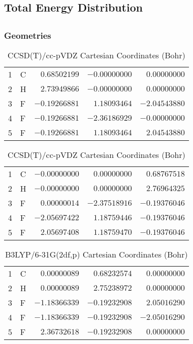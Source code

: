 \documentclass[10pt,oneside]{article}
\begin{document}
\begin{table}
\subsection*{Total Energy Distribution}
\centering\end{table}

\clearpage

\subsection{}

\begin{table}[h!]
\subsubsection*{Geometries}
\begin{multicols}{2}
\centering
\caption{CCSD(T)/cc-pVTZ Cartesian Coordinates (Bohr)}
\begin{tabular}{llrrr}
\toprule
1  & C  & $ 0.68502199$ & $-0.00000000$ & $ 0.00000000$ \\
2  & H  & $ 2.73949866$ & $-0.00000000$ & $ 0.00000000$ \\
3  & F  & $-0.19266881$ & $ 1.18093464$ & $-2.04543880$ \\
4  & F  & $-0.19266881$ & $-2.36186929$ & $-0.00000000$ \\
5  & F  & $-0.19266881$ & $ 1.18093464$ & $ 2.04543880$ \\
\bottomrule
\end{tabular}
\caption{CCSD(T)/cc-pVDZ Cartesian Coordinates (Bohr)}
\begin{tabular}{llrrr}
\toprule
1  & C  & $-0.00000000$ & $ 0.00000000$ & $ 0.68767518$ \\
2  & H  & $-0.00000000$ & $ 0.00000000$ & $ 2.76964325$ \\
3  & F  & $ 0.00000014$ & $-2.37518916$ & $-0.19376046$ \\
4  & F  & $-2.05697422$ & $ 1.18759446$ & $-0.19376046$ \\
5  & F  & $ 2.05697408$ & $ 1.18759470$ & $-0.19376046$ \\
\bottomrule
\end{tabular}
\end{multicols}
\end{table}

\begin{table}[h]
\centering
\caption{B3LYP/6-31G(2df,p) Cartesian Coordinates (Bohr)}
\begin{tabular}{llrrr}
\toprule
1  & C  & $ 0.00000089$ & $ 0.68232574$ & $ 0.00000000$ \\
2  & H  & $ 0.00000089$ & $ 2.75238972$ & $ 0.00000000$ \\
3  & F  & $-1.18366339$ & $-0.19232908$ & $ 2.05016290$ \\
4  & F  & $-1.18366339$ & $-0.19232908$ & $-2.05016290$ \\
5  & F  & $ 2.36732618$ & $-0.19232908$ & $ 0.00000000$ \\
\bottomrule
\end{tabular}
\end{table}
\end{document}
